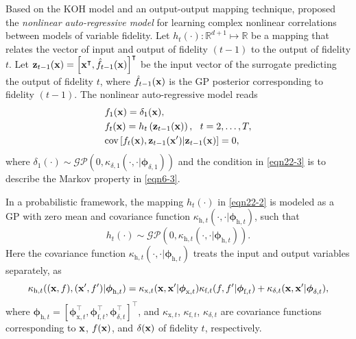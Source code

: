 \documentclass[journal ]{new-aiaa}
\begin{document}
	Based on the KOH model and an output-output mapping technique, \citet{Perdikaris2017} proposed the \textit{nonlinear auto-regressive model} for learning complex nonlinear correlations between models of variable fidelity.
	Let $h_{t}(\cdot):\mathbb{R}^{d+1} \mapsto \mathbb{R}$ be a mapping that relates the vector of input and output of fidelity $(t-1)$ to the output of fidelity $t$.
	Let ${\bf z}_{t-1}({\bf x})=\left[{\bf x}^\intercal,\hat{f}_{t-1}({\bf x})\right]^\intercal$ be the input vector of the surrogate predicting the output of fidelity $t$, where $\hat{f}_{t-1}({\bf x})$ is the GP posterior corresponding to fidelity $(t-1)$.
	The nonlinear auto-regressive model reads~\citep{Perdikaris2017}
	\begin{subequations}\label{eqn22}
		\begin{align}
			&f_1({\bf x})=\delta_1({\bf x}) \label{eqn22-1},\\
			&f_{t}({\bf x})=h_{t}\left({{\bf z}_{t-1}({\bf x})}\right), \ \  t=2,\dots,T \label{eqn22-2},\\
			&\text{cov}\left[f_{t}({\bf x}),{\bf z}_{t-1}({\bf x}')|{\bf z}_{t-1}({\bf x})\right]=0 
			\label{eqn22-3},
		\end{align}
	\end{subequations}
	where $\delta_1(\cdot) \sim \mathcal{GP}\left(0, \kappa_{\delta,1}(\cdot,\cdot|{\boldsymbol \phi}_{\delta,1})\right)$ and the condition in \cref{eqn22-3} is to describe the Markov property in \cref{eqn6-3}.
	
	In a probabilistic framework, the mapping $h_{t}(\cdot)$ in \cref{eqn22-2} is modeled as a GP with zero mean and covariance function $\kappa_{\text{h},t}(\cdot,\cdot|{\boldsymbol \phi}_{\text{h},t})$, such that
	\begin{equation}\label{eqn23}
		h_{t}(\cdot) \sim \mathcal{GP}\left(0, \kappa_{\text{h},t}(\cdot,\cdot|{\boldsymbol \phi}_{\text{h},t})\right).
	\end{equation} 
	Here the covariance function $\kappa_{\text{h},t}(\cdot,\cdot|{\boldsymbol \phi}_{\text{h},t})$ treats the input and output variables separately, as
	\begin{equation}\label{eqn24}
		\kappa_{\text{h},t}(({\bf x},f),({\bf x'},f')|{\boldsymbol \phi}_{\text{h},t})  
		=\kappa_{\text{x},t}({\bf x},{\bf x}'|{\boldsymbol \phi}_{\text{x},t})\kappa_{\text{f},t}(f,f'|{\boldsymbol \phi}_{\text{f},t}) + \kappa_{\delta,t}({\bf x},{\bf x}'|{\boldsymbol \phi}_{\delta,t}),
	\end{equation}
	where ${\boldsymbol \phi}_{\text{h},t}=[{\boldsymbol \phi}_{\text{x},t}^\intercal,{\boldsymbol \phi}_{\text{f},t}^\intercal,{\boldsymbol \phi}_{\delta,t}^\intercal]^\intercal$, and $\kappa_{\text{x},t}$, $\kappa_{\text{f},t}$, $\kappa_{\delta,t}$ are covariance functions corresponding to ${\bf x}$, $f({\bf x})$, and $\delta({\bf x})$ of fidelity $t$, respectively.
	
\end{document}
